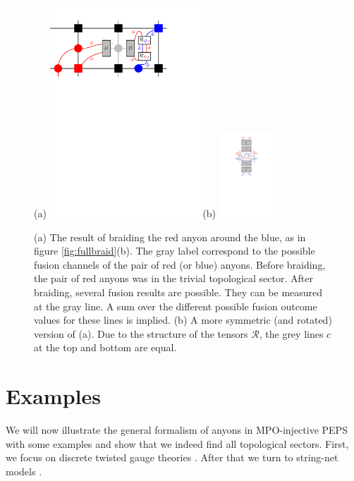 \documentclass[12 pt]{article}
\begin{document}
\begin{figure}[H]
  \centering
   (a) \includegraphics[width=0.5\textwidth]{BraidFusionChannels1.pdf}
 \quad  (b) \includegraphics[width=0.20\textwidth]{BraidFusionChannels2.pdf}
 \caption{(a) The result of braiding the red anyon around the blue, as in figure \ref{fig:fullbraid}(b). The gray label correspond to the possible fusion channels of the pair of red (or blue) anyons. Before braiding, the pair of red anyons was in the trivial topological sector. After braiding, several fusion results are possible. They can be measured at the gray line. A  sum over the different possible fusion outcome values for these lines is implied. (b) A more symmetric (and rotated) version of (a). Due to the structure of the tensors $\mathcal{R}$, the grey lines  $c$ at the top and bottom are equal.}
\label{fig:fullbraid3}
\end{figure}


\section{Examples}\label{sec:examples}

We will now illustrate the general formalism of anyons in MPO-injective PEPS with some examples and show that we indeed find all topological sectors. First, we focus on discrete twisted gauge theories \cite{DijkgraafWitten,propitius,Kitaev03,tqd}. After that we turn to string-net models \cite{LevinWen05,TuraevViro}.
\end{document}
